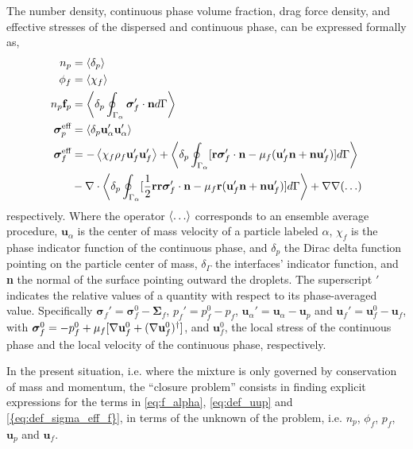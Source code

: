 The number density, continuous phase volume fraction, drag force density, and effective stresses of the dispersed and continuous phase, can be expressed formally as,
\begin{align}
    n_p &= \pavg{}
    \label{eq:n_p}\\
    \phi_f &= \avg{\chi_f}
    \label{eq:chi_f}\\
    n_p \textbf{f}_p  &= \pSavg{\bm\sigma'_f\cdot \textbf{n}}
    \label{eq:f_alpha}
    \\
    \bm{\sigma}_p^{\text{eff}} &= \pavg{\textbf{u}_\alpha'\textbf{u}_\alpha'}
    \label{eq:def_uup}
    \\
    \bm{\sigma}^{\text{eff}}_f 
    &= 
    - \avg{\chi_f\rho_f \textbf{u}_f'\textbf{u}_f'} 
    + \pSavg{[\textbf{r}\bm\sigma'_f\cdot \textbf{n} - \mu_f (\textbf{u}_f' \textbf{n} + \textbf{n} \textbf{u}_f')]}\nonumber\\
    &- \div
        \pSavg{[\frac{1}{2}\textbf{rr}\bm\sigma'_f\cdot \textbf{n}- \mu_f\textbf{r} (\textbf{u}_f' \textbf{n} + \textbf{n} \textbf{u}_f')]}
        + \grad\grad (\ldots)
    \label{eq:def_sigma_eff_f}
\end{align}
respectively. 
Where the operator $\left<\ldots\right>$ corresponds to an ensemble average procedure, 
$\textbf{u}_\alpha$ is the center of mass velocity of a particle labeled $\alpha$, $\chi_f$ is the phase indicator function of the continuous phase, and $\delta_p$ the Dirac delta function pointing on the particle center of mass, $\delta_\Gamma$ the interfaces' indicator function, and \textbf{n} the normal of the surface pointing outward the droplets. 
The superscript $'$ indicates the relative values of a quantity with respect to its phase-averaged value. 
Specifically $\bm{\sigma}_f' = \bm{\sigma}_f^0  - \bm{\Sigma}_f$, $p_f' = p_f^0 - p_f$, $\textbf{u}_\alpha' = \textbf{u}_\alpha - \textbf{u}_p$ and $\textbf{u}_f' = \textbf{u}_f^0  -\textbf{u}_f$, with $\bm{\sigma}_f^0 = -p_f^0 + \mu_f [\mathbf{\nabla} \textbf{u}_f^0 + (\mathbf{\nabla} \textbf{u}_f^0)^\dagger] $, and $\textbf{u}_f^0$, the local stress of the continuous phase and the local velocity of the continuous phase, respectively. 

In the present situation, i.e. where the mixture is only governed by conservation of mass and momentum,  the ``closure problem'' consists in finding explicit expressions for the terms in \ref{eq:f_alpha}, \ref{eq:def_uup} and \ref{{eq:def_sigma_eff_f}}, in terms of the unknown of the problem, i.e. $n_p$, $\phi_f$, $p_f$, $\textbf{u}_p$ and $\textbf{u}_f$. 

